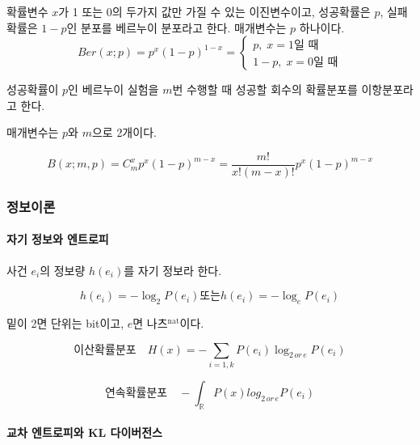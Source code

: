 \documentclass [12pt] {oblivoir}
\let\oldsubsubsection=\subsubsection
\renewcommand{\subsubsection}
{
  \filbreak
  \oldsubsubsection
}
\begin{document}
확률변수 $x$가 1 또는 0의 두가지 값만 가질 수 있는 이진변수이고, 성공확률은 $p$, 실패확률은 $1-p$인 분포를 베르누이 분포라고 한다. 매개변수는 $p$ 하나이다.
\begin{equation} \tag{2.42}
  Ber(x; p) = p^{x}(1 - p)^{1 - x} =
  \begin{cases}
    p,\;x = 1 \text{일 때} \\
    1 - p,\;x = 0 \text{일 때}
  \end{cases}
\end{equation}

성공확률이 $p$인 베르누이 실험을 $m$번 수행할 때 성공할 회수의 확률분포를 이항분포라고 한다.

매개변수는 $p$와 $m$으로 2개이다.

\begin{equation} \tag{2.43}
  B(x; m, p) = C_{m}^{x}p^{x}(1 - p)^{m - x} = \frac{m!}{x!(m - x)!}p^{x}(1 - p)^{m - x}
\end{equation}

\subsubsection{정보이론}

\paragraph*{자기 정보와 엔트로피}\mbox{}

사건 $e_{i}$의 정보량 $h(e_{i})$를 자기 정보라 한다.

\begin{equation} \tag{2.44}
  h(e_{i}) = -\log_{2}P(e_{i}) \text{또는} h(e_{i}) = -\log_{e}P(e_{i})
\end{equation}

밑이 2면 단위는 bit이고, $e$면 나츠$^{\text{nat}}$이다.

\begin{equation} \tag{2.45}
  \text{이산확률분포} \quad H(x) = -\sum_{i=1, k}P(e_{i})\log_{2\,or\,e}P(e_{i})
\end{equation}

\begin{equation} \tag{2.46}
  \text{연속확률분포} \quad -\int_{\mathds{R}}P(x)log_{2\,or\,e}P(e_{i})
\end{equation}

\paragraph*{교차 엔트로피와 KL 다이버전스}\mbox{}
\end{document}
